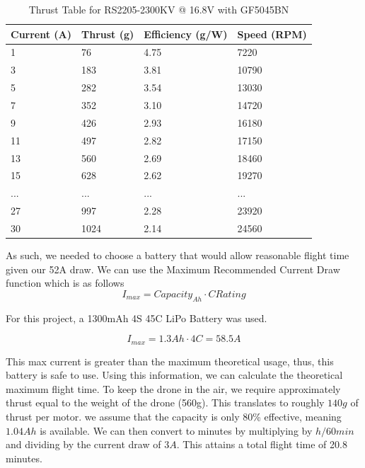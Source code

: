 \documentclass{article}
\begin{document}
\begin{table}[h!]
\centering
\begin{tabular}{|l|l|l|l|}
\hline
Current (A) & Thrust (g) & Efficiency (g/W) & Speed (RPM) \\ \hline
1           & 76         & 4.75             & 7220        \\ \hline
3           & 183        & 3.81             & 10790       \\ \hline
5           & 282        & 3.54             & 13030       \\ \hline
7           & 352        & 3.10             & 14720       \\ \hline
9           & 426        & 2.93             & 16180       \\ \hline
11          & 497        & 2.82             & 17150       \\ \hline
13          & 560        & 2.69             & 18460       \\ \hline
15          & 628        & 2.62             & 19270       \\ \hline
...         & ...        & ...              & ...         \\ \hline
27          & 997        & 2.28             & 23920       \\ \hline
30          & 1024       & 2.14             & 24560       \\ \hline
\end{tabular}
\caption{Thrust Table for RS2205-2300KV @ 16.8V with GF5045BN}
\end{table}

As such, we needed to choose a battery that would allow reasonable flight time given our 52A draw. We can use the Maximum Recommended Current Draw function which is as follows
\begin{equation}
I_{max} = Capacity_{Ah} \cdot C Rating
\end{equation}

For this project, a 1300mAh 4S 45C LiPo Battery was used. 

\[
I_{max} = 1.3Ah \cdot 4C = 58.5A
\]

This max current is greater than the maximum theoretical usage, thus, this battery is safe to use. Using this information, we can calculate the theoretical maximum flight time. To keep the drone in the air, we require approximately thrust equal to the weight of the drone (560g). This translates to roughly $140g$ of thrust per motor. we assume that the capacity is only 80\% effective, meaning $1.04Ah$ is available. We can then convert to minutes by multiplying by $h/60min$ and dividing by the current draw of $3A$. This attains a total flight time of 20.8 minutes.  
\end{document}
